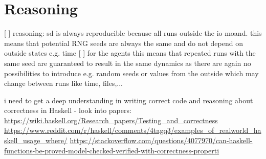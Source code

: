\section{Reasoning}
[ ] reasoning: sd is always reproducible because all runs outside the io moand. this means that potential RNG seeds are always the same and do not depend on outside states e.g. time
[ ] for the agents this means that repeated runs with the same seed are guaranteed to result in the same dynamics as there are again no possibilities to introduce e.g. random seeds or values from the outside which may change between runs like time, files,...

i need to get a deep understanding in writing correct code and reasoning about correctness in Haskell - look into papers:
\url{https://wiki.haskell.org/Research_papers/Testing_and_correctness}
\url{https://www.reddit.com/r/haskell/comments/4tagq3/examples_of_realworld_haskell_usage_where/}
\url{https://stackoverflow.com/questions/4077970/can-haskell-functions-be-proved-model-checked-verified-with-correctness-properti}\\